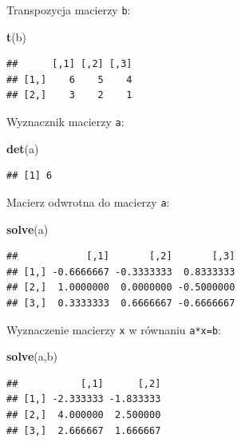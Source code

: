 \documentclass[]{book}
\newenvironment{Shaded}{\begin{snugshade}}{\end{snugshade}}
\newcommand{\KeywordTok}[1]{\textcolor[rgb]{0.13,0.29,0.53}{\textbf{#1}}}
\newcommand{\StringTok}[1]{\textcolor[rgb]{0.31,0.60,0.02}{#1}}
\newcommand{\OperatorTok}[1]{\textcolor[rgb]{0.81,0.36,0.00}{\textbf{#1}}}
\newcommand{\NormalTok}[1]{#1}
\begin{document}
Transpozycja macierzy \texttt{b}:

\begin{Shaded}
\begin{Highlighting}[]
\KeywordTok{t}\NormalTok{(b)}
\end{Highlighting}
\end{Shaded}

\begin{verbatim}
##      [,1] [,2] [,3]
## [1,]    6    5    4
## [2,]    3    2    1
\end{verbatim}

Wyznacznik macierzy \texttt{a}:

\begin{Shaded}
\begin{Highlighting}[]
\KeywordTok{det}\NormalTok{(a)}
\end{Highlighting}
\end{Shaded}

\begin{verbatim}
## [1] 6
\end{verbatim}

Macierz odwrotna do macierzy \texttt{a}:

\begin{Shaded}
\begin{Highlighting}[]
\KeywordTok{solve}\NormalTok{(a)}
\end{Highlighting}
\end{Shaded}

\begin{verbatim}
##            [,1]       [,2]       [,3]
## [1,] -0.6666667 -0.3333333  0.8333333
## [2,]  1.0000000  0.0000000 -0.5000000
## [3,]  0.3333333  0.6666667 -0.6666667
\end{verbatim}

Wyznaczenie macierzy \texttt{x} w równaniu \texttt{a*x=b}:

\begin{Shaded}
\begin{Highlighting}[]
\KeywordTok{solve}\NormalTok{(a,b)}
\end{Highlighting}
\end{Shaded}

\begin{verbatim}
##           [,1]      [,2]
## [1,] -2.333333 -1.833333
## [2,]  4.000000  2.500000
## [3,]  2.666667  1.666667
\end{verbatim}

\begin{Shaded}
\end{Shaded}
\end{document}
